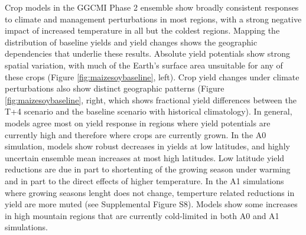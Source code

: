 \documentclass[gmd, manuscript]{copernicus} %
\begin{document}
Crop models in the GGCMI Phase 2 ensemble show broadly consistent responses to climate and management perturbations in most regions, with a strong negative impact of increased temperature in all but the coldest regions. 
Mapping the distribution of baseline yields and yield changes shows the geographic dependencies that underlie these results. 
Absolute yield potentials show strong spatial variation, with much of the Earth's surface area unsuitable for any of these crops (Figure \ref{fig:maizesoybaseline}, left).
Crop yield changes under climate perturbations also show distinct geographic patterns (Figure \ref{fig:maizesoybaseline}, right, which shows fractional yield differences between the T+4 scenario and the baseline scenario with historical climatology).
In general, models agree most on yield response in regions where yield potentials are currently high and therefore where crops are currently grown. 
In the A0 simulation, models show robust decreases in yields at low latitudes, and highly uncertain ensemble mean increases at most high latitudes.
Low latitude yield reductions are due in part to shortenting of the growing season under warming and in part to the direct effects of higher temperature.
In the A1 simulations where growing seasons lenght does not change, temperture related reductions in yield are more muted (see Supplemental Figure S8).
Models show some increases in high mountain regions that are currently cold-limited in both A0 and A1 simulations.
\end{document}
